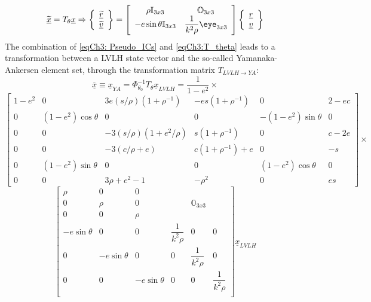 		\begin{equation}
		\underline{\widetilde{x}} = T_{\theta} \underline{x} \Rightarrow
		\left\{
		\begin{array}{c}
		\underline{\widetilde{r}}\\
		\underline{\widetilde{v}}
		\end{array}
		\right\}
		= \left[
		\begin{array}{cc}
		\rho \mathbb{I}_{3x3} 			& \mathbb{O}_{3x3} \\
		-e \sin\theta \mathbb{I}_{3x3} 	& \dfrac{1}{k^2 \rho} \eye_{3x3} 
		\end{array}
		\right]
		\left\{
		\begin{array}{c}
		\underline{r}\\
		\underline{v}
		\end{array}
		\right\}
		\label{eqCh3:T_theta}
		\end{equation}
		\indent The combination of \eqref{eqCh3: Pseudo_ICs} and \eqref{eqCh3:T_theta} leads to a transformation between a LVLH state vector and the so-called Yamanaka-Ankersen element set, through the transformation matrix $T_{LVLH\to YA}$:
		\[\underline{\overline{x}} \equiv \underline{x}_{YA} = \Phi_{\theta_0}^{-1} T_{\theta} \underline{x}_{LVLH} = \dfrac{1}{1 - e^2} \times\]
		\[
		\left[
		\begin{array}{cccccc}
		1 - e^2	&    0 					&  3 e  (s/\rho)  (1 + \rho^{-1})		& -e s  (1 + \rho^{-1})	&    0						&                 2 - e c\\
        0		&  (1 - e^2) \cos\theta	&         0							&                 0		&  -(1 - e^2) \sin\theta 	&              0\\
        0 		&  	0					&     -3  (s/\rho)  (1 + e^2/\rho)	&   s  (1 + \rho^{-1})	&    0						&              c - 2e	\\
        0		&    0					&          -3  (c/\rho + e)			&  c  (1 + \rho^{-1}) + e	&    0						&      -s 		\\
        0		& (1 - e^2) \sin\theta 	&                0 					&                 0		&  (1 - e^2) \cos\theta 	&                              0\\
        0		&	0 					&             3  \rho + e^2 - 1		&           -\rho^2 	&    0						& e s
		\end{array}
		\right] \times
		\]
		\begin{equation}
		\label{eqCh3:LVLH2YA}
		\left[
		\begin{array}{cccccc}
		\rho  			& 0 			& 0 			&  						&  						&  	\\
		0 				& \rho 			& 0 			& 						& \mathbb{O}_{3x3} 		&  	\\
		0  				& 0 			& \rho 			&  						&  						&  	\\
		-e \sin\theta  	& 0 			& 0 			& \dfrac{1}{k^2 \rho} 	& 0 					& 0 \\
		0  				& -e \sin\theta & 0 			& 0 					& \dfrac{1}{k^2 \rho} 	& 0 \\
		0  				& 0 			& -e \sin\theta	& 0 					& 0 					& \dfrac{1}{k^2 \rho} \\
		\end{array}
		\right]
		\underline{x}_{LVLH}
		\end{equation}
